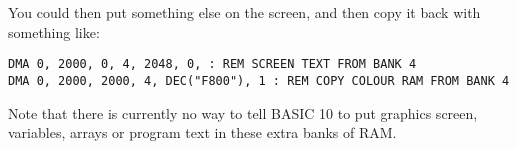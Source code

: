 You could then put something else on the screen, and then copy it back with something like:

\begin{tcolorbox}[colback=black,coltext=white]
\verbatimfont{\codefont}
\begin{verbatim}
DMA 0, 2000, 0, 4, 2048, 0, : REM SCREEN TEXT FROM BANK 4
DMA 0, 2000, 2000, 4, DEC("F800"), 1 : REM COPY COLOUR RAM FROM BANK 4
\end{verbatim}
\end{tcolorbox}

Note that there is currently no way to tell BASIC 10 to put graphics screen, variables,
arrays or program text in these extra banks of RAM.
